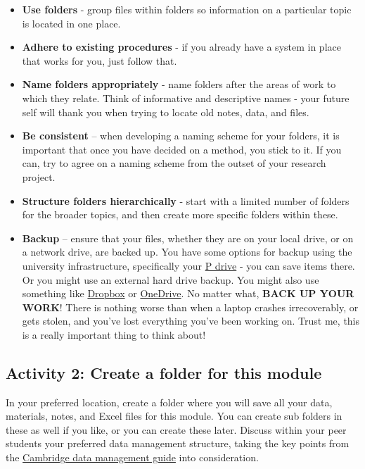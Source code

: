 \documentclass[
]{book}
\providecommand{\tightlist}{%
  \setlength{\itemsep}{0pt}\setlength{\parskip}{0pt}}
\begin{document}
\begin{itemize}
\tightlist
\item
  \textbf{Use folders} - group files within folders so information on a particular topic is located in one place.
\item
  \textbf{Adhere to existing procedures} - if you already have a system in place that works for you, just follow that.
\item
  \textbf{Name folders appropriately} - name folders after the areas of work to which they relate. Think of informative and descriptive names - your future self will thank you when trying to locate old notes, data, and files.
\item
  \textbf{Be consistent} -- when developing a naming scheme for your folders, it is important that once you have decided on a method, you stick to it. If you can, try to agree on a naming scheme from the outset of your research project.
\item
  \textbf{Structure folders hierarchically} - start with a limited number of folders for the broader topics, and then create more specific folders within these.
\item
  \textbf{Backup} -- ensure that your files, whether they are on your local drive, or on a network drive, are backed up. You have some options for backup using the university infrastructure, specifically your \href{https://pdrives.manchester.ac.uk/horde/login.php}{P drive} - you can save items there. Or you might use an external hard drive backup. You might also use something like \href{https://www.dropbox.com/home}{Dropbox} or \href{https://onedrive.live.com/about/en-gb/signin/}{OneDrive}. No matter what, \textbf{BACK UP YOUR WORK}! There is nothing worse than when a laptop crashes irrecoverably, or gets stolen, and you've lost everything you've been working on. Trust me, this is a really important thing to think about!
\end{itemize}

\hypertarget{activity-2-create-a-folder-for-this-module}{%
\subsection{Activity 2: Create a folder for this module}\label{activity-2-create-a-folder-for-this-module}}

In your preferred location, create a folder where you will save all your data, materials, notes, and Excel files for this module. You can create sub folders in these as well if you like, or you can create these later. Discuss within your peer students your preferred data management structure, taking the key points from the \href{(https://www.data.cam.ac.uk/data-management-guide/organising-your-data)}{Cambridge data management guide} into consideration.
\end{document}
